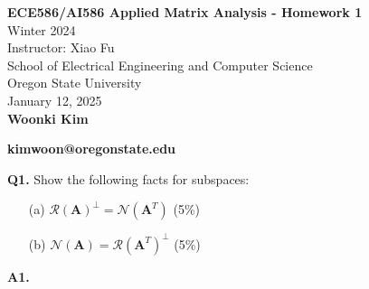 \documentclass[12pt]{article}
\newcommand{\bmat}[1]{\mathbf{#1}} %
\begin{document}
\begin{center}
    \Large \textbf{ECE586/AI586 Applied Matrix Analysis - Homework 1} \\[5pt]
    \large Winter 2024 \\
    Instructor: Xiao Fu \\[10pt]
    School of Electrical Engineering and Computer Science \\
    Oregon State University \\[10pt]
    January 12, 2025 \\[20pt]
    \textbf{Woonki Kim}
    
    \textbf{kimwoon@oregonstate.edu}
\end{center}


\textbf{Q1.} Show the following facts for subspaces:
\begin{enumerate}
    \item[(a)] \( \mathcal{R}(\bmat{A})^\perp = \mathcal{N}(\bmat{A}^T) \) \hfill (5\%)
    \item[(b)] \( \mathcal{N}(\bmat{A}) = \mathcal{R}(\bmat{A}^T)^\perp \) \hfill (5\%)
\end{enumerate}
\vspace{\baselineskip}
\textbf{A1.}
\end{document}
